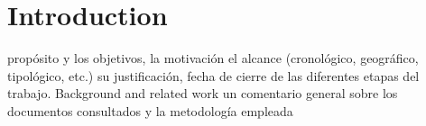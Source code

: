 \chapter{Introduction}
\label{introchap}

propósito y los objetivos, la motivación
el alcance (cronológico, geográfico, tipológico, etc.) su justificación,
fecha de cierre de las diferentes etapas del trabajo.
Background and related work
un comentario general sobre los documentos consultados y la metodología empleada
